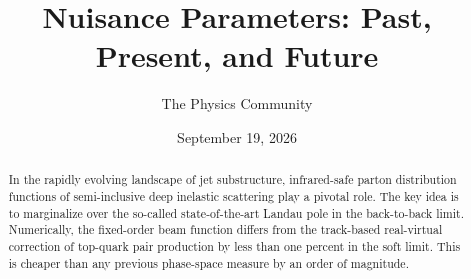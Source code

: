 \documentclass[11pt]{article}
\title{Nuisance Parameters: Past, Present, and Future}
\author{The Physics Community}
\date{September 19, 2026}
\begin{document}
\maketitle
\begin{abstract}
In the rapidly evolving landscape of jet substructure, infrared-safe
parton distribution functions of semi-inclusive deep inelastic
scattering play a pivotal role. The key idea is to marginalize over the
so-called state-of-the-art Landau pole in the back-to-back limit.
Numerically, the fixed-order beam function differs from the track-based
real-virtual correction of top-quark pair production by less than one
percent in the soft limit. This is cheaper than any previous phase-space
measure by an order of magnitude.
\end{abstract}
\tableofcontents




\nocite{*}


\end{document}
